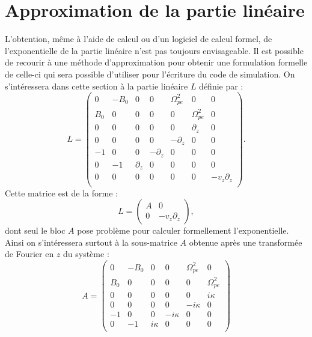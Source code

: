 
\section{Approximation de la partie linéaire}
\label{s3:approx}

L'obtention, même à l'aide de calcul ou d'un logiciel de calcul formel, de l'exponentielle de la partie linéaire n'est pas toujours envisageable. Il est possible de recourir à une méthode d'approximation pour obtenir une formulation formelle de celle-ci qui sera possible d'utiliser pour l'écriture du code de simulation. On s'intéressera dans cette section à la partie linéaire $L$ définie par :
$$
  L = \begin{pmatrix}
    0   & -B_0 & 0          &  0          &  \Omega_{pe}^2 & 0             & 0 \\
    B_0 &  0   & 0          &  0          &  0             & \Omega_{pe}^2 & 0 \\
    0   &  0   & 0          &  0          &  0             & \partial_z    & 0 \\
    0   &  0   & 0          &  0          & -\partial_z    & 0             & 0 \\
   -1   &  0   & 0          & -\partial_z &  0             & 0             & 0 \\
    0   & -1   & \partial_z &  0          &  0             & 0             & 0 \\
    0   &  0   & 0          &  0          &  0             & 0             & -v_z\partial_z \\
  \end{pmatrix}.
$$
Cette matrice est de la forme :
$$
  L = \begin{pmatrix}
    A & 0 \\
    0 & -v_z\partial_z
  \end{pmatrix},
$$
dont seul le bloc $A$ pose problème pour calculer formellement l'exponentielle. Ainsi on s'intéressera surtout à la sous-matrice $A$ obtenue après une transformée de Fourier en $z$ du système :
\begin{equation}
  A = \begin{pmatrix}
    0   & -B_0 & 0       &  0       &  \Omega_{pe}^2  & 0             \\
    B_0 &  0   & 0       &  0       &  0              & \Omega_{pe}^2 \\
    0   &  0   & 0       &  0       &  0              & i\kappa       \\
    0   &  0   & 0       &  0       & -i\kappa        & 0             \\
   -1   &  0   & 0       & -i\kappa &  0              & 0             \\
    0   & -1   & i\kappa &  0       &  0              & 0             \\
  \end{pmatrix}
  \label{eq:3:A}
\end{equation}

